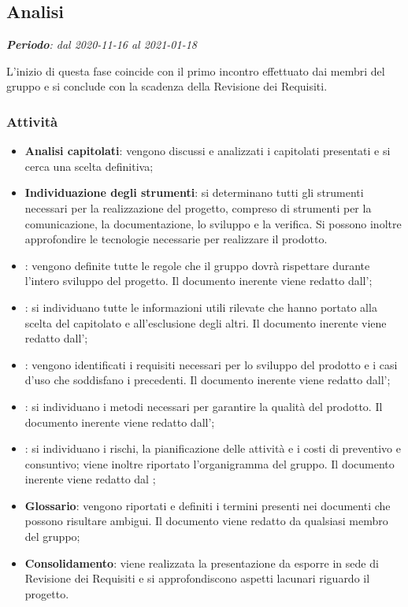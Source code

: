 \subsection{Analisi}

\textit{\textbf{Periodo}: dal 2020-11-16 al 2021-01-18}

L'inizio di questa fase coincide con il primo incontro effettuato dai membri del gruppo e si conclude con la scadenza della Revisione dei Requisiti.

\subsubsection{Attività}

\begin{itemize}
\item \textbf{Analisi capitolati}: vengono discussi e analizzati i capitolati presentati e si cerca una scelta definitiva;
\item \textbf{Individuazione degli strumenti}: si determinano tutti gli strumenti necessari per la realizzazione del progetto, compreso di strumenti per la comunicazione, la documentazione, lo sviluppo e la verifica. Si possono inoltre approfondire le tecnologie necessarie per realizzare il prodotto.
\item \textbf{\NdP{}}: vengono definite tutte le regole che il gruppo dovrà rispettare durante l'intero sviluppo del progetto. Il documento inerente viene redatto dall'\ammProg{};
\item \textbf{\SdF{}}: si individuano tutte le informazioni utili rilevate che hanno portato alla scelta del capitolato e all'esclusione degli altri. Il documento inerente viene redatto dall'\analProg{};
\item \textbf{\AdR{}}: vengono identificati i requisiti necessari per lo sviluppo del prodotto e i casi d'uso che soddisfano i precedenti. Il documento inerente viene redatto dall'\analProg{};
\item \textbf{\PdQ{}}: si individuano i metodi necessari per garantire la qualità del prodotto. Il documento inerente viene redatto dall'\ammProg{};
\item \textbf{\PdP{}}: si individuano i rischi, la pianificazione delle attività e i costi di preventivo e consuntivo; viene inoltre riportato l'organigramma del gruppo. Il documento inerente viene redatto dal \respProg{};
\item \textbf{Glossario}: vengono riportati e definiti i termini presenti nei documenti che possono risultare ambigui. Il documento viene redatto da qualsiasi membro del gruppo;
\item \textbf{Consolidamento}: viene realizzata la presentazione da esporre in sede di Revisione dei Requisiti e si approfondiscono aspetti lacunari riguardo il progetto.
\end{itemize}

